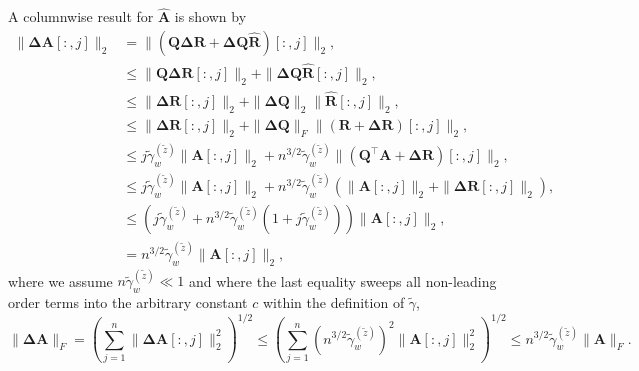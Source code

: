 \documentclass[review,onefignum,onetabnum]{siamart190516}
\newcommand{\bb}[1]{\mathbf{#1}}
\begin{document}
A columnwise result for $\hat{\bb{A}}$ is shown by
\begin{align*}
\|\bb{\Delta A}[:,j]\|_2 & = \|(\bb{Q \Delta R} + \bb{\Delta Q} \hat{\bb{R}} )[:,j]\|_2,\\
&\leq \|\bb{Q \Delta R}[:,j]\|_2  + \|\bb{\Delta Q}\hat{\bb{R}}[:,j]\|_2,\\
&\leq \|\bb{\Delta R}[:,j]\|_2 + \|\bb{\Delta Q}\|_2\|\hat{\bb{R}}[:,j]\|_2,\\
&\leq \|\bb{\Delta R}[:,j]\|_2 + \|\bb{\Delta Q}\|_F\|(\bb{R} +\bb{\Delta R})[:,j]\|_2,\\
&\leq j\tilde{\gamma}_w^{(\tilde{z})}\|\bb{A}[:,j]\|_2 + n^{3/2}\tilde{\gamma}_w^{(\tilde{z})} \|(\bb{Q}^{\top}\bb{A} +\bb{\Delta R})[:,j]\|_2,\\
&\leq j\tilde{\gamma}_w^{(\tilde{z})}\|\bb{A}[:,j]\|_2 + n^{3/2}\tilde{\gamma}_w^{(\tilde{z})} \left(\|\bb{A}[:,j]\|_2 +\|\bb{\Delta R}[:,j]\|_2\right),\\
&\leq \left(j\tilde{\gamma}_w^{(\tilde{z})} + n^{3/2}\tilde{\gamma}_w^{(\tilde{z})}  (1+j\tilde{\gamma}_w^{(\tilde{z})})\right)\|\bb{A}[:,j]\|_2,\\
&=n^{3/2}\tilde{\gamma}_w^{(\tilde{z})}  \|\bb{A}[:,j]\|_2,
\end{align*}
where we assume $n\tilde{\gamma}_w^{(\tilde{z})}\ll 1$ and where the last equality sweeps all non-leading order terms into the arbitrary constant $c$ within the definition of $\tilde{\gamma}$,
\begin{equation}
\|\bb{\Delta A}\|_F = \left(\sum_{j=1}^n \|\bb{\Delta A}[:,j]\|_2^2\right)^{1/2} \leq \left(\sum_{j=1}^n (n^{3/2}\tilde{\gamma}_w^{(\tilde{z})})^2 \|\bb{A}[:,j]\|_2^2\right)^{1/2} \leq n^{3/2}\tilde{\gamma}_w^{(\tilde{z})} \|\bb{A}\|_F.
\end{equation}






\end{document}
